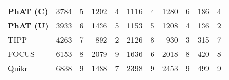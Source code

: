 \begin{table}[htb]
{\begin{center}
\begin{tabular}{lrrrrrrrrrr}
        \textbf{PhAT (C)}   &   3784    &   5   &   1202    &   4   &  1116     &   4   &  1280     &   6   & 186   &   4   \\
        \textbf{PhAT (U)}   &   3933    &   6   &   1436    &   5   &  1153     &   5   &  1208     &   4   & 136   &   2   \\
        TIPP                &   4263    &   7   &   892     &   2   &  2126     &   8   &  930      &   3   & 315   &   7   \\
        FOCUS               &   6153    &   8   &   2079    &   9   &  1636     &   6   &  2018     &   8   & 420   &   8   \\
        Quikr               &   6838    &   9   &   1488    &   7   &  2398     &   9   &  2453     &   9   & 499   &   9   \\
        \bottomrule
    \end{tabular}
    \end{center}
}
\end{table}




